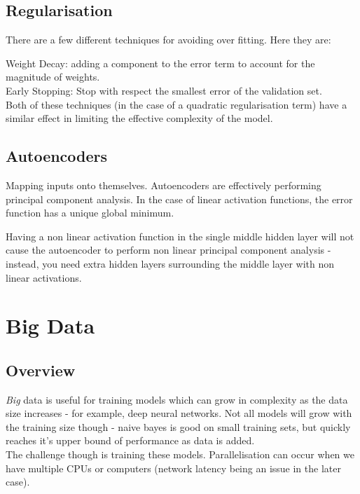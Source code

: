 \documentclass[a4paper]{article}
\begin{document}
    \subsection{Regularisation}
    There are a few different techniques for avoiding over fitting. Here they are:
    
    Weight Decay: adding a component to the error term to account for the magnitude of weights. \\
    
    Early Stopping: Stop with respect the smallest error of the validation set. \\
    
    Both of these techniques (in the case of a quadratic regularisation term) have a similar effect in limiting the effective complexity of the model.
    
    \subsection{Autoencoders}
    
    Mapping inputs onto themselves. Autoencoders are effectively performing principal component analysis. In the case of linear activation functions, the error function has a unique global minimum.  
    
    Having a non linear activation function in the single middle hidden layer will not cause the autoencoder to perform non linear principal component analysis - instead, you need extra hidden layers surrounding the middle layer with non linear activations.
    
	\clearpage
	\section{Big Data}
	
	\subsection{Overview}
	
	\textit{Big} data is useful for training models which can grow in complexity as the data size increases - for example, deep neural networks. Not all models will grow with the training size though - naive bayes is good on small training sets, but quickly reaches it's upper bound of performance as data is added. \\
	
	The challenge though is training these models. Parallelisation can occur when we have multiple CPUs or computers (network latency being an issue in the later case). \\
	
\end{document}
